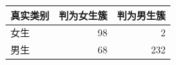 \begin{tabular}{lrr}
\toprule
真实类别 & 判为女生簇 & 判为男生簇 \\
\midrule
女生 & 98 & 2 \\
男生 & 68 & 232 \\
\bottomrule
\end{tabular}
